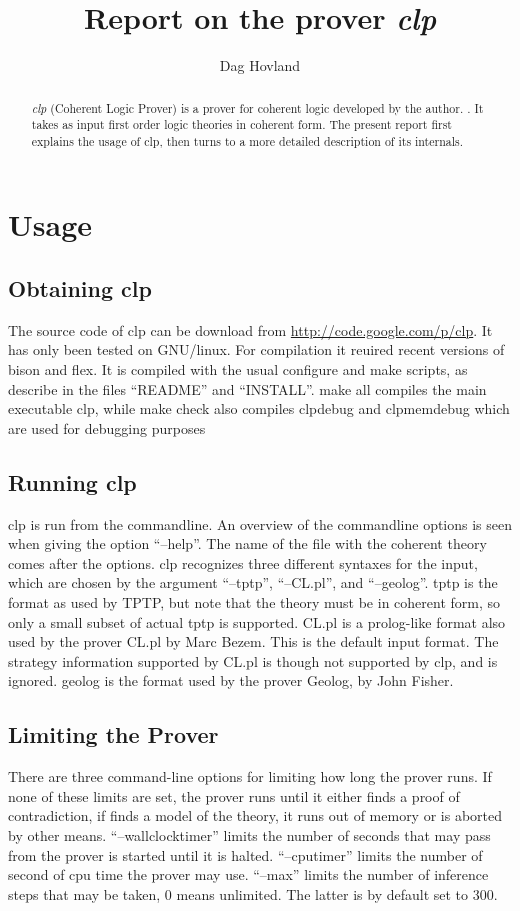 \documentclass[a4paper]{article}
\author{Dag Hovland}
\title{Report on the prover \emph{clp}}
\begin{document}
\maketitle
\begin{abstract}
  \emph{clp} (Coherent Logic Prover) is a prover for coherent logic developed by the author. . It takes as input first order logic theories in coherent form. The present report first explains the usage of clp, then turns to a more detailed description of its internals.
\end{abstract}
\section{Usage}
\subsection{Obtaining clp}
The source code of clp can be download from \url{http://code.google.com/p/clp}. It has only been tested on GNU/linux. For compilation it reuired recent versions of bison and flex. It is compiled with the usual configure and make scripts, as describe in the files ``README'' and ``INSTALL''. make all compiles the main executable clp, while make check also compiles clpdebug and clpmemdebug which are used for debugging purposes
\subsection{Running clp}
clp is run from the commandline. An overview of the commandline options is seen when giving the option ``--help''. The name of the file with the coherent theory comes after the options. clp recognizes three different syntaxes for the input, which are chosen by the argument ``--tptp'', ``--CL.pl'', and ``--geolog''. tptp is the format as used by TPTP, but note that the theory must be in coherent form, so only a small subset of actual tptp is supported. CL.pl is a prolog-like format also used by the prover CL.pl by Marc Bezem. This is the default input format. The strategy information supported by CL.pl is though not supported by clp, and is ignored. geolog is the format used by the prover Geolog, by John Fisher.

\subsection{Limiting the Prover}
There are three command-line options for limiting how long the prover runs. If none of these limits are set, the prover runs until it either finds a proof of contradiction, if finds a model of the theory, it runs out of memory or is aborted by other means. ``--wallclocktimer'' limits the number of seconds that may pass from the prover is started until it is halted. ``--cputimer'' limits the number of second of cpu time the prover may use. ``--max'' limits the number of inference steps that may be taken, $0$ means unlimited. The latter is by default set to $300$.
\end{document}
